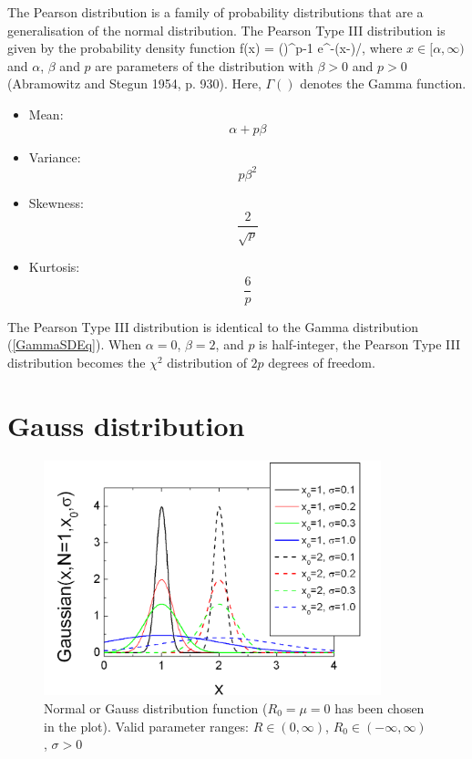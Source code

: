 The Pearson distribution is a family of probability distributions
that are a generalisation of the normal distribution. The Pearson
Type III distribution is given by the probability density function
\BE
    f(x) =  \left(\right)^{p-1} e^{-(x-\alpha)/\beta}, \!
\EE where $x \in [\alpha,\infty)$ and $\alpha$, $\beta$ and $p$
are parameters of the distribution with $\beta > 0$ and $p > 0$
(Abramowitz and Stegun 1954, p. 930). Here, $\Gamma ()$ denotes
the Gamma function.
\begin{itemize}
\item Mean:
$$
    \alpha + p\beta
$$
\item Variance:
$$
    p\beta^2
$$
\item Skewness:
$$
    \frac{2}{\sqrt{p}}
$$
\item Kurtosis:
$$
    \frac{6}{p}
$$
\end{itemize}
The Pearson Type III distribution is identical to the Gamma
distribution (\ref{GammaSDEq}). When $\alpha=0$, $\beta=2$, and
$p$ is half-integer, the Pearson Type III distribution becomes the
$\chi^2$ distribution of $2p$ degrees of freedom.


\clearpage
\section{Gauss distribution}

\begin{figure}[htb]
\begin{center}
\includegraphics[width=0.873\textwidth,height=0.653\textwidth]{GaussSD.png}
\end{center}
\caption{Normal or Gauss distribution function ($R_0=\mu=0$ has
been chosen in the plot). Valid parameter ranges: $R \in
(0,\infty)$, $R_0 \in (-\infty,\infty)$, $\sigma>0$}
\label{NormalDistr}
\end{figure}

